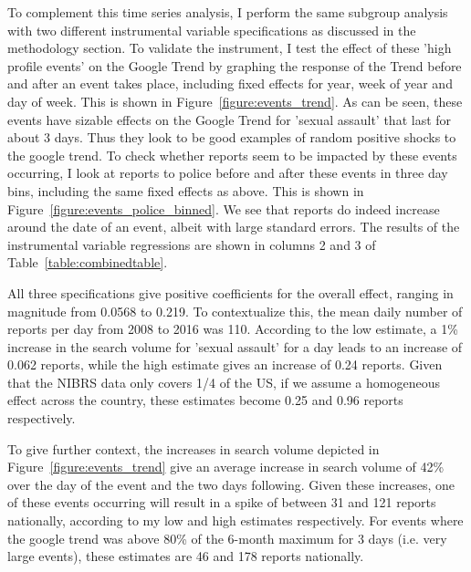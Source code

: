 \documentclass[AER,draftmode]{AEA}
\begin{document}
To complement this time series analysis, I perform the same subgroup analysis with two different instrumental variable specifications as discussed in the methodology section. To validate the instrument, I test the effect of these 'high profile events' on the Google Trend by graphing the response of the Trend before and after an event takes place, including fixed effects for year, week of year and day of week. This is shown in Figure~\ref{figure:events_trend}. As can be seen, these events have sizable effects on the Google Trend for 'sexual assault' that last for about 3 days. Thus they look to be good examples of random positive shocks to the google trend. To check whether reports seem to be impacted by these events occurring, I look at reports to police before and after these events in three day bins, including the same fixed effects as above. This is shown in Figure~\ref{figure:events_police_binned}. We see that reports do indeed increase around the date of an event, albeit with large standard errors.  The results of the instrumental variable regressions are shown in columns 2 and 3 of Table~\ref{table:combinedtable}. 

All three specifications give positive coefficients for the overall effect, ranging in magnitude from 0.0568 to 0.219. To contextualize this, the mean daily number of reports per day from 2008 to 2016 was 110.  According to the low estimate, a 1\% increase in the search volume for 'sexual assault' for a day leads to an increase of 0.062 reports, while the high estimate gives an increase of 0.24 reports. Given that the NIBRS data only covers 1/4 of the US, if we assume a homogeneous effect across the country, these estimates become 0.25 and 0.96 reports respectively.

To give further context, the increases in search volume depicted in Figure~\ref{figure:events_trend} give an average increase in search volume of 42\% over the day of the event and the two days following. Given these increases, one of these events occurring will result in a spike of between 31 and 121 reports nationally, according to my low and high estimates respectively. For events where the google trend was above 80\% of the 6-month maximum for 3 days (i.e. very large events), these estimates are 46 and 178 reports nationally.
\end{document}

